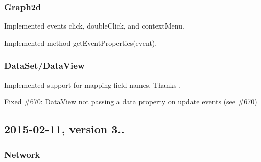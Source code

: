 \subsubsection*{Graph2d}


\begin{DoxyItemize}
\item Implemented events {\ttfamily click}, {\ttfamily double\+Click}, and {\ttfamily context\+Menu}.
\item Implemented method {\ttfamily get\+Event\+Properties(event)}.
\end{DoxyItemize}

\subsubsection*{Data\+Set/\+Data\+View}


\begin{DoxyItemize}
\item Implemented support for mapping field names. Thanks .
\item Fixed \#670\+: Data\+View not passing a data property on update events (see \#670)
\end{DoxyItemize}

\subsection*{2015-\/02-\/11, version 3..}

\subsubsection*{Network}


